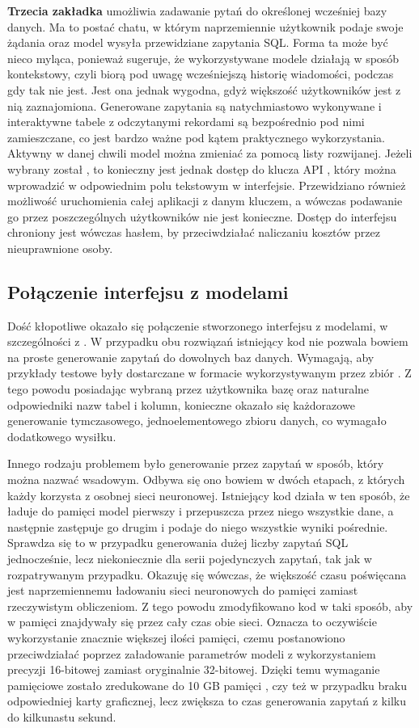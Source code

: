\textbf{Trzecia zakładka} umożliwia zadawanie pytań do określonej wcześniej bazy danych. Ma to postać chatu, w którym naprzemiennie użytkownik podaje swoje żądania oraz model wysyła przewidziane zapytania SQL. Forma ta może być nieco myląca, ponieważ sugeruje, że wykorzystywane modele działają w sposób kontekstowy, czyli biorą pod uwagę wcześniejszą historię wiadomości, podczas gdy tak nie jest. Jest ona jednak wygodna, gdyż większość użytkowników jest z nią zaznajomiona. Generowane zapytania są natychmiastowo wykonywane i interaktywne tabele z odczytanymi rekordami są bezpośrednio pod nimi zamieszczane, co jest bardzo ważne pod kątem praktycznego wykorzystania. Aktywny w danej chwili model można zmieniać za pomocą listy rozwijanej. Jeżeli wybrany został , to konieczny jest jednak dostęp do klucza API , który można wprowadzić w odpowiednim polu tekstowym w interfejsie. Przewidziano również możliwość uruchomienia całej aplikacji z danym kluczem, a wówczas podawanie go przez poszczególnych użytkowników nie jest konieczne. Dostęp do interfejsu chroniony jest wówczas hasłem, by przeciwdziałać naliczaniu kosztów przez nieuprawnione osoby.

\subsection{Połączenie interfejsu z modelami}
Dość kłopotliwe okazało się połączenie stworzonego interfejsu z modelami, w szczególności z . W przypadku obu rozwiązań istniejący kod nie pozwala bowiem na proste generowanie zapytań do dowolnych baz danych. Wymagają, aby przykłady testowe były dostarczane w formacie wykorzystywanym przez zbiór . Z tego powodu posiadając wybraną przez użytkownika bazę oraz naturalne odpowiedniki nazw tabel i kolumn, konieczne okazało się każdorazowe generowanie tymczasowego, jednoelementowego zbioru danych, co wymagało dodatkowego wysiłku.

Innego rodzaju problemem było generowanie przez  zapytań w sposób, który można nazwać wsadowym. Odbywa się ono bowiem w dwóch etapach, z których każdy korzysta z osobnej sieci neuronowej. Istniejący kod działa w ten sposób, że ładuje do pamięci model pierwszy i przepuszcza przez niego wszystkie dane, a następnie zastępuje go drugim i podaje do niego wszystkie wyniki pośrednie. Sprawdza się to w przypadku generowania dużej liczby zapytań SQL jednocześnie, lecz niekoniecznie dla serii pojedynczych zapytań, tak jak w rozpatrywanym przypadku. Okazuję się wówczas, że większość czasu poświęcana jest naprzemiennemu ładowaniu sieci neuronowych do pamięci zamiast rzeczywistym obliczeniom. Z tego powodu zmodyfikowano kod w taki sposób, aby w pamięci znajdywały się przez cały czas obie sieci. Oznacza to oczywiście wykorzystanie znacznie większej ilości pamięci, czemu postanowiono przeciwdziałać poprzez załadowanie parametrów modeli z wykorzystaniem precyzji 16-bitowej zamiast oryginalnie 32-bitowej. Dzięki temu wymaganie pamięciowe zostało zredukowane do 10 GB pamięci , czy też  w przypadku braku odpowiedniej karty graficznej, lecz zwiększa to czas generowania zapytań z kilku do kilkunastu sekund.

